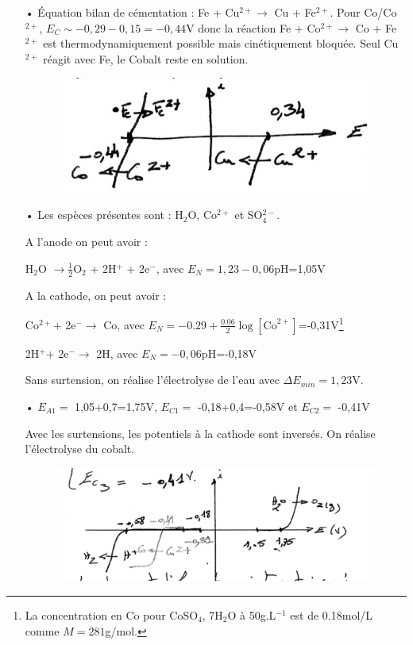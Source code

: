 \documentclass{report}
\begin{document}
\begin{itemize}
	\item[•] Équation  bilan de cémentation : Fe + Cu$^{2+}\longrightarrow$ Cu + Fe$^{2+}$.
	Pour Co/Co$^{2+}$, $E_C\sim-0,29-0,15=-0,44$V donc la réaction Fe + Co$^{2+}\longrightarrow$ Co + Fe$^{2+}$ est thermodynamiquement possible mais cinétiquement bloquée. Seul Cu$^{2+}$ réagit avec Fe, le Cobalt reste en solution.
	\begin{figure}[!h]
	\centering
	\includegraphics[width=0.5\linewidth]{Chimie1.png}
	\end{figure}

	\item[•] Les espèces présentes sont : H$_2$O, Co$^{2+}$ et SO$_{4}^{2-}$.
	
	A l'anode on peut avoir :  
	
	H$_2$O $\longrightarrow\frac{1}{2}$O$_2$ + 2H$^+$ + 2e$^-$, avec $E_N=1,23-0,06$pH=1,05V
	
	A la cathode, on peut avoir : 
	
	 Co$^{2+}$+ 2e$^-\longrightarrow$ Co, avec $E_N=-0.29+\frac{0.06}{2}\log[\mathrm{Co}^{2+}]$=-0,31V\footnote{La concentration en Co pour CoSO$_4$, 7H$_2$O à 50g.L$^{-1}$ est de 0.18mol/L comme $M=281$g/mol.}

	 2H$^{+}$+ 2e$^-\longrightarrow$ 2H, avec $E_N=-0,06$pH=-0,18V
	 
	 Sans surtension, on réalise l'électrolyse de l'eau avec $\Delta E_{min}=1,23$V.
	 
	 \item[•] $E_{A1} =$ 1,05+0,7=1,75V, $E_{C1} =$ -0,18+0,4=-0,58V et $E_{C2} =$ -0,41V
	 
	 Avec les surtensions, les potentiels à la cathode sont inversés. On réalise l'électrolyse du cobalt. 
	 \begin{figure}[!h]
	\centering
	\includegraphics[width=0.8\linewidth]{Chimie2.png}
	\end{figure}


\end{itemize}
\end{document}
